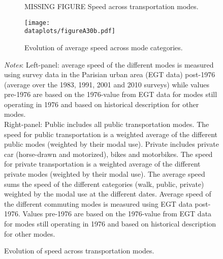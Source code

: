 \documentclass[11pt]{report}
\newcommand{\dataplots}{../output/data/plots}
\begin{document}
\vspace{1cm}
\begin{figure}[h!]	
	\hspace{-15mm}
	\begin{subfigure}{0.55\textwidth}
\vspace{-0.1cm}
\caption{MISSING FIGURE Speed across transportation modes.\label{A-fig:speed1}}
	\end{subfigure}%
	\hspace{5mm}
	\begin{subfigure}{0.55\textwidth}
	\texttt{[image: \\dataplots/figureA30b.pdf]}
\vspace{-0.1cm}
\caption{Evolution of average speed across mode categories.\label{A-fig:speed2}}
	\end{subfigure}%
	\caption{Evolution of speed across transportation modes.}
	\footnotesize {\textit{%
		Notes}: Left-panel: average speed of the different modes is measured using survey data in the Parisian urban area (EGT data) post-1976 (average over the 1983, 1991, 2001 and 2010 surveys) while values pre-1976 are based on the 1976-value from EGT data for modes still operating in 1976 and based on historical description for other modes.\\
		Right-panel: Public includes all public transportation modes. The speed for public transportation is a weighted average of the different public modes (weighted by their modal use). Private includes private car (horse-drawn and motorized), bikes and motorbikes. The speed for private transportation is a weighted average of the different private modes (weighted by their modal use). The average speed sums the speed of the different categories (walk, public, private) weighted by the modal use at the different dates. Average speed of the different commuting modes is measured using EGT data post-1976. Values pre-1976 are based on the 1976-value from EGT data for modes still operating in 1976 and based on historical description for other modes.}
\end{figure}
\pagebreak


\end{document}
